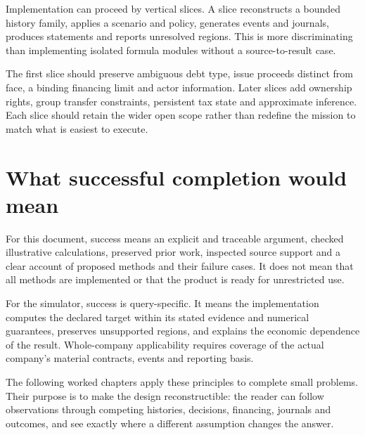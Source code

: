 Implementation can proceed by vertical slices. A slice reconstructs a bounded history family, applies a scenario and policy, generates events and journals, produces statements and reports unresolved regions. This is more discriminating than implementing isolated formula modules without a source-to-result case.

The first slice should preserve ambiguous debt type, issue proceeds distinct from face, a binding financing limit and actor information. Later slices add ownership rights, group transfer constraints, persistent tax state and approximate inference. Each slice should retain the wider open scope rather than redefine the mission to match what is easiest to execute.

\section{What successful completion would mean}
For this document, success means an explicit and traceable argument, checked illustrative calculations, preserved prior work, inspected source support and a clear account of proposed methods and their failure cases. It does not mean that all methods are implemented or that the product is ready for unrestricted use.

For the simulator, success is query-specific. It means the implementation computes the declared target within its stated evidence and numerical guarantees, preserves unsupported regions, and explains the economic dependence of the result. Whole-company applicability requires coverage of the actual company's material contracts, events and reporting basis.

The following worked chapters apply these principles to complete small problems. Their purpose is to make the design reconstructible: the reader can follow observations through competing histories, decisions, financing, journals and outcomes, and see exactly where a different assumption changes the answer.
